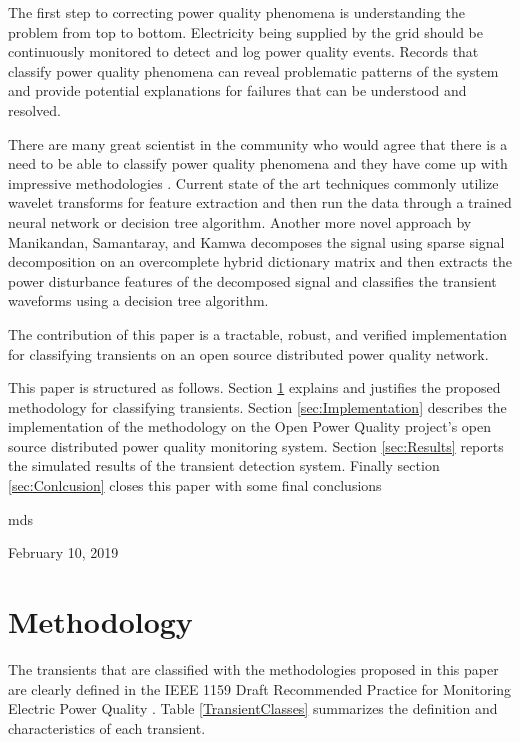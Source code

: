 \documentclass[10pt,conference,compsocconf]{IEEEtran}
\begin{document}
The first step to correcting power quality phenomena is understanding the problem from top to bottom. Electricity being supplied by the grid should be continuously monitored to detect and log power quality events. Records that classify power quality phenomena can reveal problematic patterns of the system and provide potential explanations for failures that can be understood and resolved. 

There are many great scientist in the community who would agree that there is a need to be able to classify power quality phenomena and they have come up with impressive methodologies \cite{Garrido:2014:PhenomenaClassification} \cite{Manikandan:2014:PQClassificationUsingSSD} \cite{Thirumala:2016:PQClassificationUsingWavelet} \cite{Rodriguez:2014:PQClassificationUsingANN} \cite{Tse:2012:PQClassificationUsingHHT}. Current state of the art techniques commonly utilize wavelet transforms for feature extraction and then run the data through a trained neural network or decision tree algorithm.  Another more novel approach by Manikandan, Samantaray, and Kamwa \cite{Manikandan:2014:PQClassificationUsingSSD} decomposes the signal using sparse signal decomposition on an overcomplete hybrid dictionary matrix and then extracts the power disturbance features of the decomposed signal and classifies the transient waveforms using a decision tree algorithm. 

The contribution of this paper is a tractable, robust, and verified implementation for classifying transients on an open source distributed power quality network. 

This paper is structured as follows. Section \ref{sec:Methodology} explains and justifies the proposed methodology for classifying transients. Section \ref{sec:Implementation} describes the implementation of the methodology on the Open Power Quality project's open source distributed power quality monitoring system. Section \ref{sec:Results} reports the simulated results of the transient detection system. Finally section \ref{sec:Conlcusion} closes this paper with some final conclusions


\hfill mds
 
\hfill February 10, 2019

\section{Methodology}
\label{sec:Methodology}
The transients that are classified with the methodologies proposed in this paper are clearly defined in the IEEE 1159 Draft Recommended Practice for Monitoring Electric Power Quality \cite{IEEE:2018:1159D3}. Table \ref{TransientClasses} summarizes the definition and characteristics of each transient.
\end{document}
